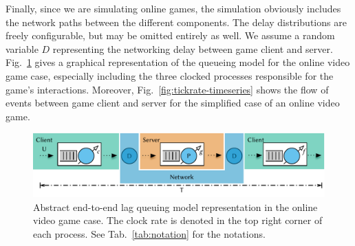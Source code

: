 Finally, since we are simulating online games, the simulation obviously includes the network paths between the different components. The delay distributions are freely configurable, but may be omitted entirely as well. We assume a random variable $D$ representing the networking delay between game client and server. Fig.~\ref{fig:queuing-model} gives a graphical representation of the queueing model for the online video game case, especially including the three clocked processes responsible for the game's interactions.
Moreover, Fig.~\ref{fig:tickrate-timeseries} shows the flow of events between game client and server for the simplified case of an online video game.

\begin{figure}[!t]
	\centering
	\includegraphics[width=1.0\textwidth]{../../models/e2e-lag-model.pdf}
	\caption{Abstract end-to-end lag queuing model representation in the online video game case. The clock rate is denoted in the top right corner of each process. See Tab.~\ref{tab:notation} for the notations.
	}
\label{fig:queuing-model}
\end{figure}


